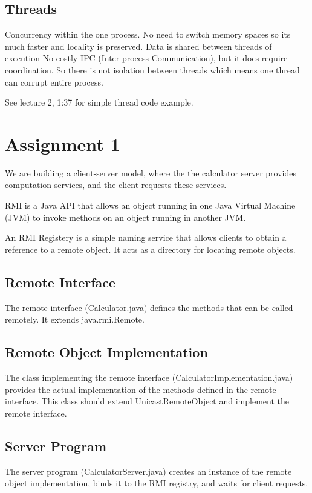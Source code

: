 \documentclass[12pt, letterpaper]{article}
\begin{document}
\subsection*{Threads}
Concurrency within the one process.
No need to switch memory spaces so its 
much faster and locality is preserved. 
Data is shared between threads of execution 
No costly IPC (Inter-process Communication), but 
it does require coordination. So there is 
not isolation between threads which means 
one thread can corrupt entire process. 

See lecture 2, 1:37 for simple thread code example. 

\section*{Assignment 1}
We are building a client-server model, where the the calculator server 
provides computation services, and the client requests these services.

RMI is a Java API that allows an object running in one Java Virtual 
Machine (JVM) to invoke methods on an object running in another JVM.

An RMI Registery is a simple naming service that allows clients to 
obtain a reference to a remote object. It acts as a directory for locating remote objects.

\subsection*{Remote Interface}
The remote interface (Calculator.java) defines the methods that 
can be called remotely. It extends java.rmi.Remote.  

\subsection*{Remote Object Implementation}
The class implementing the remote interface (CalculatorImplementation.java) 
provides the actual implementation of the methods defined in the remote interface. 
This class should extend UnicastRemoteObject and implement the remote interface.

\subsection*{Server Program}
The server program (CalculatorServer.java) creates an instance of the remote object 
implementation, binds it to the RMI registry, and waits for client requests.
\end{document}

